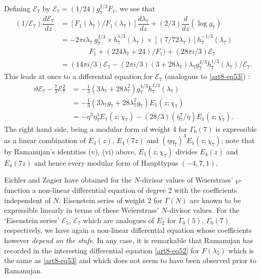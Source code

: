 Defining $\mathscr{E}_{7}$ by $\mathscr{E}_{7}=(1/24)g^{2/3}_{7}F_{1}$, we see that
\begin{align*}
(1/\mathscr{E}_{7})\dfrac{d\mathscr{E}_{7}}{dz} &= [F_{1}(\lambda_{7})/F_{1}(\lambda_{7})]\dfrac{d\lambda_{7}}{dz}+(2/3)\dfrac{d}{dz}(\log g_{7})\\
&=-2\pi i\lambda_{7} \ g^{2/3}_{7}\times h^{1/3}_{7}(\lambda_{7})\times [(7/72\lambda_{7})]h^{-1/3}_{7}(\lambda_{7})\\
&\qquad\qquad F_{1}+(224\lambda_{7}+24)/F_{1})+(28\pi i/3)\mathscr{E}_{7}\\
&= (14\pi i/3)\mathscr{E}_{7}-(2\pi i/3)(3+28\lambda_{7})\lambda_{7}g^{4/3}_{7}h^{1/3}_{7}(\lambda_{7})/\mathscr{E}_{7}.
\end{align*}
This leads at once to a differential equation for $\mathscr{E}_{7}$ (analogous to \eqref{art8-eq53}) :
\begin{align*}
\vartheta\mathscr{E}_{7}-\frac{7}{3}\mathscr{E}\frac{2}{7} &=-\frac{1}{3}(3\lambda_{7}+28\lambda^{2}_{7})g^{4/3}_{7}h^{1/3}_{7}(\lambda_{7})\\
&= -\frac{1}{3}(3\lambda_{7}g_{7}+28\lambda^{2}_{7}g_{7})E_{1}(z;\chi_{7})\\
&= -\eta^{3}\eta^{3}_{7}E_{1}(z;\chi_{7})-(28/3)(\eta^{7}_{7}/\eta)E_{1}(z;\chi_{7}).
\end{align*}\pageoriginale
The right hand side, being a modular form of weight 4 for $\Gamma_{0}(7)$ is expressible as a linear combination of $E_{4}(z)$, $E_{4}(7z)$ and $(\eta\eta_{7})^{3}E_{1}(z;\chi_{7})$; note that by Ramanujan's identities (v), (vi) above, $E_{1}(z;\chi_{7})$ divides $E_{4}(z)$ and $E_{4}(7z)$ and hence every modular form of Haupttypus $(-4,7,1)$.

\begin{remark*}
Eichler and Zagier \cite{art8-key2} have obtained for the $N$-divisor values of Weierstrass' $\wp$-function a non-linear differential equation of degree 2 with the coefficients independent of $N$. Eisenstein series of weight 2 for $\Gamma(N)$ are known to be expressible linearly in terms of these Weierstrass' $N$-divisor values. For the `Eisenstein series' $\mathscr{E}_{5}$, $\mathscr{E}_{7}$ which are analogues of $E_{2}$ for $\Gamma_{0}(5)$, $\Gamma_{0}(7)$ respectively, we have again a non-linear differential equation whose coefficients however {\em depend on the stufe}. In any case, it is remarkable that Ramanujan has recorded in \cite{art8-key11} the interesting differential equation \eqref{art8-eq52} for $F(\lambda_{5})$ which is the same as \eqref{art8-eq53} and which does not seem to have been observed prior to Ramanujan.
\end{remark*}

